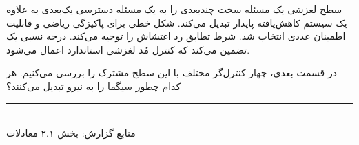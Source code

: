 \documentclass[12pt, a4paper]{article}
\newcommand{\dash}{\lr{---}}
\begin{document}
سطح لغزشی يک مسئله سخت چندبعدی را به يک مسئله دسترسی يک‌بعدی به علاوه يک سيستم کاهش‌يافته پايدار تبديل می‌کند. شکل خطی برای پاکيزگی رياضی و قابليت اطمينان عددی انتخاب شد. شرط تطابق رد اغتشاش را توجيه می‌کند. درجه نسبی يک تضمين می‌کند که کنترل مُد لغزشی استاندارد اعمال می‌شود.

در قسمت بعدی، چهار کنترل‌گر مختلف با اين سطح مشترک را بررسی می‌کنيم. هر کدام چطور سيگما را به نيرو تبديل می‌کنند؟

\vspace{1.5cm}
\begin{center}
{\color{seriesblue}\rule{0.45\linewidth}{0.4pt}}\\[8pt]
{\small\color{sectiongray}
منابع گزارش: بخش ۲.۱ \dash{} معادلات 
}
\end{center}
\end{document}
